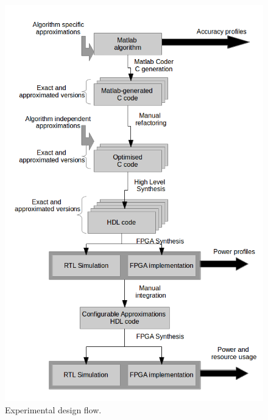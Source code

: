 \begin{figure}[tb]
  \centering
  \includegraphics[width=0.9\columnwidth]{img/experimental_flow.png}
  \caption{Experimental design flow.}
  \label{fig:experimental_flow}
\end{figure}
